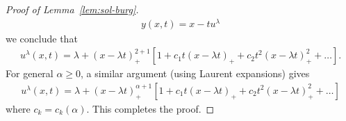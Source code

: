 \documentclass[12pt,reqno]{amsart}
\numberwithin{equation}{section}  %
\numberwithin{figure}{section}
\begin{document}
\begin{proof}[Proof of Lemma~\ref{lem:sol-burg}]
\begin{equation*}
\begin{split}
y(x,t) = x - tu^{\lambda}
\end{split}
\end{equation*}
%
%
we conclude that
%
%
%
\begin{equation*}
\begin{split}
u^{\lambda}(x,t) = \lambda + (x - \lambda
t)_{+}^{2 + 1}[1 + c_{1}t(x - \lambda t)_{+} +
c_{2}t^{2}(x - \lambda t)_{+}^{2} + \ldots].
\end{split}
\end{equation*}
%
For general $\alpha \ge 0$, a similar argument (using Laurent expansions) gives
\begin{equation}
    \label{ode-sol}
\begin{split}
u^{\lambda}(x,t) = \lambda + (x - \lambda
t)_{+}^{\alpha + 1}[1 + c_{1}t(x - \lambda t)_{+} +
c_{2}t^{2}(x - \lambda t)_{+}^{2} + \ldots]
\end{split}
\end{equation}
where $c_{k} = c_{k}(\alpha)$. This completes the proof.
%
\end{proof}

%
%
%
%
%
%
\end{document}
